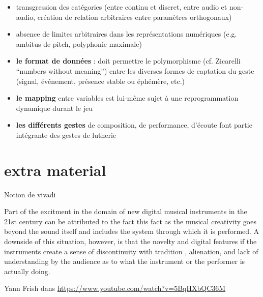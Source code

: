 \vspace{-1em}
\begin{itemize}[noitemsep]
\item transgression des catégories (entre continu et discret, entre audio et non-audio, création de relation arbitraires entre paramètres orthogonaux)
\item absence de limites arbitraires dans les représentations numériques (e.g. ambitus de pitch, polyphonie maximale)
\end{itemize}

\vspace{-1em}
\begin{itemize}[noitemsep]
\item \textbf{le format de données} : doit permettre le polymorphisme (cf. Zicarelli ``numbers without meaning'') entre les diverses formes de captation du geste (signal, événement, présence stable ou éphémère, etc.)
\item \textbf{le mapping} entre variables est lui-même sujet à une reprogrammation dynamique durant le jeu
\item \textbf{les différents gestes} de composition, de performance, d'écoute font partie intégrante des gestes de lutherie
\end{itemize}


\section*{extra material}
Notion de vivadi

Part of the excitment in the domain of new digital musical instruments in the 21st century can be attributed to the fact this fact as the musical creativity goes beyond the sound itself and includes the system through which it is performed. A downside of this situation, however, is that the novelty and digital features if the instruments create a sense of discontinuity with tradition , alienation, and lack of understanding by the audience as to what the instrument or the performer is actually doing.
\cite{magnusson_sonic_2019}



 Yann Frish dans \url{https://www.youtube.com/watch?v=5BqHXbQC36M}






